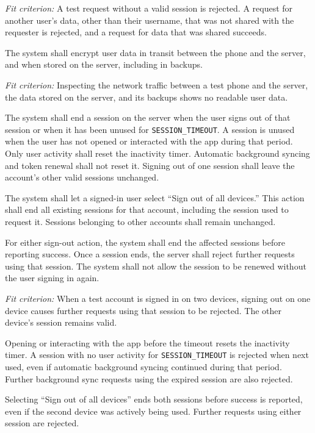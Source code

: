 \documentclass[12pt]{article}
\begin{document}
\begin{description}
\textit{Fit criterion:} A test request without a valid session is rejected. A
request for another user's data, other than their username, that was not
shared with the requester is rejected, and a request for data that was shared
succeeds.

\item[SEC-16 (Protect data in transit and at rest).] The system shall encrypt user data in transit between the phone and the
server, and when stored on the server, including in backups.

\textit{Fit criterion:} Inspecting the network traffic between a test phone
and the server, the data stored on the server, and its backups shows no
readable user data.

\item[SEC-17 (Session expiry and sign-out).]
The system shall end a session on the server when the user signs out of
that session or when it has been unused for \texttt{SESSION\_TIMEOUT}.
A session is unused when the user has not opened or interacted with the
app during that period. Only user activity shall reset the inactivity
timer. Automatic background syncing and token renewal shall not reset
it. Signing out of one session shall leave the account's other valid
sessions unchanged.

The system shall let a signed-in user select ``Sign out of all devices.''
This action shall end all existing sessions for that account, including
the session used to request it. Sessions belonging to other accounts
shall remain unchanged.

For either sign-out action, the system shall end the affected sessions
before reporting success. Once a session ends, the server shall reject
further requests using that session. The system shall not allow the
session to be renewed without the user signing in again.

\textit{Fit criterion:} When a test account is signed in on two devices,
signing out on one device causes further requests using that session
to be rejected. The other device's session remains valid.

Opening or interacting with the app before the timeout resets the
inactivity timer. A session with no user activity for
\texttt{SESSION\_TIMEOUT} is rejected when next used, even if automatic
background syncing continued during that period. Further background
sync requests using the expired session are also rejected.

Selecting ``Sign out of all devices'' ends both sessions before success
is reported, even if the second device was actively being used.
Further requests using either session are rejected.


\end{description}
\end{document}
